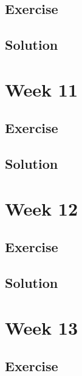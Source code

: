 \documentclass[
]{book}
\begin{document}
\hypertarget{exercise-8}{%
\section{Exercise}\label{exercise-8}}

\hypertarget{solution-9}{%
\section{Solution}\label{solution-9}}

\hypertarget{week-11}{%
\chapter{Week 11}\label{week-11}}

\hypertarget{exercise-9}{%
\section{Exercise}\label{exercise-9}}

\hypertarget{solution-10}{%
\section{Solution}\label{solution-10}}

\hypertarget{week-12}{%
\chapter{Week 12}\label{week-12}}

\hypertarget{exercise-10}{%
\section{Exercise}\label{exercise-10}}

\hypertarget{solution-11}{%
\section{Solution}\label{solution-11}}

\hypertarget{week-13}{%
\chapter{Week 13}\label{week-13}}

\hypertarget{exercise-11}{%
\section{Exercise}\label{exercise-11}}
\end{document}
